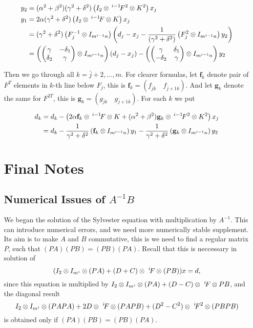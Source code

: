 \documentclass[11pt,a4paper]{article}
\begin{document}
\begin{enumerate}
\begin{align*}
y_2&=(\alpha^2+\beta^2)(\gamma^2+\delta^2)
\left(I_2\otimes\,^{i-1}\!F^2\otimes K^2\right)x_j\\
y_1&=2\alpha(\gamma^2+\delta^2)\left(I_2\otimes\,^{i-1}\!F\otimes
K\right)x_j\\
   &=(\gamma^2+\delta^2)
      \left(F_j^{-1}
         \otimes I_{m^{i-1}n}\right)
      \left(d_j-x_j-\frac{1}{(\gamma^2+\delta^2)}
        \left(
         F_j^2
         \otimes I_{m^{i-1}n}\right)y_2\right)\\
   &=\left(\begin{pmatrix}\gamma&-\delta_1\cr\delta_2&\gamma\end{pmatrix}
           \otimes I_{m^{i-1}n}\right)(d_j-x_j)
     -\left(\begin{pmatrix}\gamma&\delta_1\cr-\delta_2&\gamma\end{pmatrix}
           \otimes I_{m^{i-1}n}\right)y_2
\end{align*}

Then we go through all $k=\bar j+2,\ldots, m$. For clearer formulas, let
$\mathbf f_k$ denote pair of $F^T$ elements in $k$-th line below $F_j$,
this is $\mathbf f_k=(f_{\bar jk}\quad f_{\bar j+1k})$. And let $\mathbf g_k$
denote the same for $F^{2T}$, this is $\mathbf g_k=(g_{\bar jk}\quad
g_{\bar j+1k})$. For each $k$ we put

\begin{align*}
d_k &= d_k - \left(2\alpha\mathbf f_k\otimes
                   \,^{i-1}\!F\otimes K +
                   (\alpha^2+\beta^2)\mathbf g_k\otimes
                   \,^{i-1}\!F^2\otimes K^2\right)x_j\\
    &= d_k - \frac{1}{\gamma^2+\delta^2}
             \left(\mathbf f_k\otimes
                   I_{m^{i-1}n}\right)y_1
           - \frac{1}{\gamma^2+\delta^2}
             \left(\mathbf g_k\otimes
                   I_{m^{i-1}n}\right)y_2
\end{align*}

\end{enumerate}

\section{Final Notes}

\subsection{Numerical Issues of $A^{-1}B$}

We began the solution of the Sylvester equation with multiplication by
$A^{-1}$.  This can introduce numerical errors, and we need more
numerically stable supplement. Its aim is to make $A$ and $B$
commutative, this is we need to find a regular matrix $P$, such that
$(PA)(PB)=(PB)(PA)$. Recall that this is neccessary in solution of
$$
(I_2\otimes I_{m^i}\otimes (PA)+(D+C)\otimes\,\,^i\!F\otimes (PB))x=d,
$$
since this equation is
multiplied by $I_2\otimes I_{m^i}\otimes (PA)+(D-C)\otimes\,\,^i\!F\otimes PB$,
and the diagonal
result 
$$
I_2\otimes I_{m^i}\otimes (PAPA) + 2D\otimes\,\,^i\!F\otimes (PAPB) +
(D^2-C^2)\otimes\,\,^i\!F^2\otimes (PBPB)
$$
is obtained only if
$(PA)(PB)=(PB)(PA)$.
\end{document}
